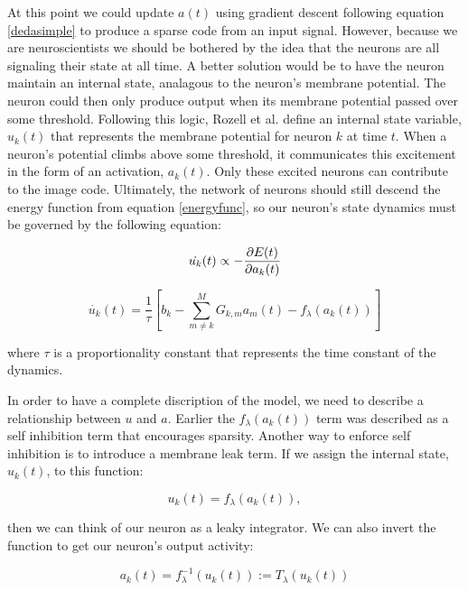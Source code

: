 At this point we could update $a(t)$ using gradient descent following equation \eqref{dedasimple} to produce a sparse code from an input signal. However, because we are neuroscientists we should be bothered by the idea that the neurons are all signaling their state at all time. A better solution would be to have the neuron maintain an internal state, analagous to the neuron's membrane potential. The neuron could then only produce output when its membrane potential passed over some threshold. Following this logic, Rozell et al. define an internal state variable, $u_{k}(t)$ that represents the membrane potential for neuron $k$ at time $t$. When a neuron's potential climbs above some threshold, it communicates this excitement in the form of an activation, $a_{k}(t)$. Only these excited neurons can contribute to the image code. Ultimately, the network of neurons should still descend the energy function from equation \eqref{energyfunc}, so our neuron's state dynamics must be governed by the following equation:

\begin{displaymath}
    \dot{u_{k}}(t) \propto - \frac{\partial E(t)} {\partial a_{k}(t)} \\
\end{displaymath}

\begin{equation}\label{udot}
    \dot{u_{k}}(t) = \frac{1}{\tau} \left[b_{k} - \sum_{m \neq k}^{M}G_{k,m}a_{m}(t) - f_{\lambda}(a_{k}(t)) \right]
\end{equation}

where $\tau$ is a proportionality constant that represents the time constant of the dynamics.

In order to have a complete discription of the model, we need to describe a relationship between $u$ and $a$. Earlier the $f_{\lambda}(a_{k}(t))$ term was described as a self inhibition term that encourages sparsity. Another way to enforce self inhibition is to introduce a membrane leak term. If we assign the internal state, $u_{k}(t)$, to this function:

\begin{equation}\label{ufunca}
    u_k(t) = f_{\lambda}(a_{k}(t)),
\end{equation}

then we can think of our neuron as a leaky integrator. We can also invert the function to get our neuron's output activity:

\begin{displaymath}\label{athresh}
    a_{k}(t) = f_{\lambda}^{-1}(u_{k}(t)) := T_{\lambda}(u_{k}(t))
\end{displaymath}

